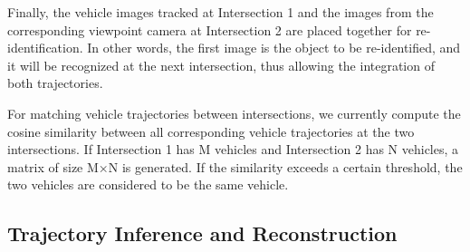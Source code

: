 Finally, the vehicle images tracked at Intersection 1 and the images from the corresponding viewpoint camera at Intersection 2 are placed together for re-identification. 
In other words, the first image is the object to be re-identified, and it will be recognized at the next intersection, thus allowing the integration of both trajectories.

For matching vehicle trajectories between intersections, we currently compute the cosine similarity between all corresponding vehicle trajectories at the two intersections. 
If Intersection 1 has M vehicles and Intersection 2 has N vehicles, a matrix of size M×N is generated. 
If the similarity exceeds a certain threshold, the two vehicles are considered to be the same vehicle.

\subsection{Trajectory Inference and Reconstruction}


